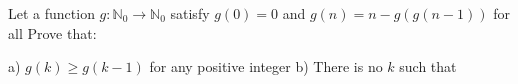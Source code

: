 Let a function $g:\mathbb{N}_0\to\mathbb{N}_0$ satisfy $g(0)=0$ and $g(n)=n-g(g(n-1))$ for all  Prove that:

a) $g(k)\ge g(k-1)$ for any positive integer 
b) There is no $k$ such that 
